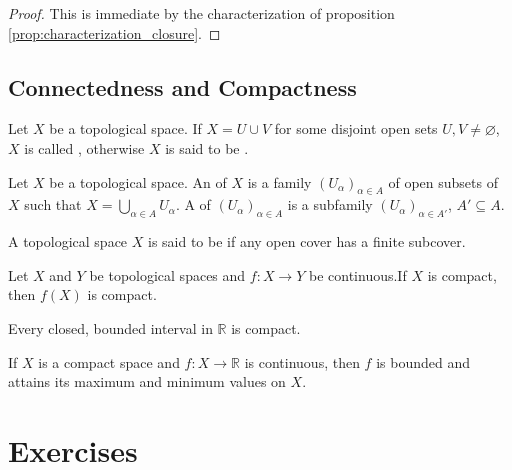 \begin{proof}
	This is immediate by the characterization of proposition \ref{prop:characterization_closure}.
\end{proof}

\subsection{Connectedness and Compactness}

\begin{definition}
	Let $X$ be a topological space. If $X = U \cup V$ for some disjoint open sets $U,V \neq \varnothing$, $X$ is called , otherwise $X$ is said to be .
\end{definition}

\begin{definition}
	Let $X$ be a topological space. An  of $X$ is a family $(U_\alpha)_{\alpha \in A}$ of open subsets of $X$ such that $X = \bigcup_{\alpha \in A}U_\alpha$. A  of $(U_\alpha)_{\alpha \in A}$ is a subfamily $(U_\alpha)_{\alpha \in A'}$, $A' \subseteq A$.	
\end{definition}

\begin{definition}
	A topological space $X$ is said to be  if any open cover has a finite subcover.
\end{definition}

\begin{theorem}
	Let $X$ and $Y$ be topological spaces and $f: X \to Y$ be continuous.If $X$ is compact, then $f(X)$ is compact.
	\label{thm:main_theorem_compactness}
\end{theorem}

\begin{proposition}
	Every closed, bounded interval in $\mathbb{R}$ is compact.
\end{proposition}

\begin{theorem}
	If $X$ is a compact space and $f: X \to \mathbb{R}$ is continuous, then $f$ is bounded and attains its maximum and minimum values on $X$.
	\label{thm:extreme_value_theorem}
\end{theorem}

\section*{Exercises}
